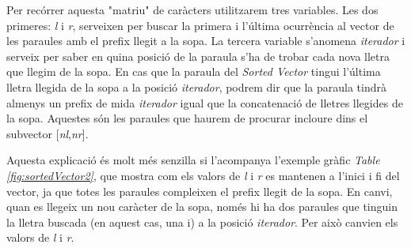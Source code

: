 \documentclass[titlepage]{article}
\begin{document}
Per recórrer aquesta "matriu" de caràcters utilitzarem tres variables. Les dos primeres: \textit{l} i \textit{r}, serveixen per buscar la primera i l'última ocurrència al vector de les paraules amb el prefix llegit a la sopa. La tercera variable s'anomena \textit{iterador} i serveix per saber en quina posició de la paraula s'ha de trobar cada nova lletra que llegim de la sopa. En cas que la paraula del \textit{Sorted Vector} tingui l'última lletra llegida de la sopa a la posició \textit{iterador}, podrem dir que la paraula tindrà almenys un prefix de mida \textit{iterador} igual que la concatenació de lletres llegides de la sopa. Aquestes són les paraules que haurem de procurar incloure dins el subvector [\textit{nl},\textit{nr}]. \newline\par
Aquesta explicació és molt més senzilla si l'acompanya l'exemple gràfic \textit{Table \ref{fig:sortedVector2}}, que mostra com els valors de \textit{l} i \textit{r} es mantenen a l'inici i fi del vector, ja que totes les paraules compleixen el prefix llegit de la sopa. En canvi, quan es llegeix un nou caràcter de la sopa, només hi ha dos paraules que tinguin la lletra buscada (en aquest cas, una i) a la posició \textit{iterador}. Per això canvien els valors de \textit{l} i \textit{r}.\newline
\end{document}

